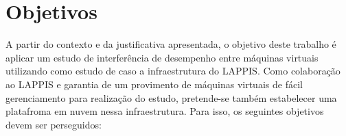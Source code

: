 \section{Objetivos}


A partir do contexto e da justificativa apresentada, o objetivo deste trabalho é aplicar um estudo de interferência de desempenho entre máquinas virtuais utilizando como estudo de caso a infraestrutura do LAPPIS\footnotemark[1].                                                      Como colaboração ao LAPPIS e garantia de um provimento de máquinas virtuais de fácil gerenciamento para realização do estudo, pretende-se também estabelecer uma platafroma em nuvem nessa infraestrutura. Para isso, os seguintes objetivos devem ser perseguidos: 


